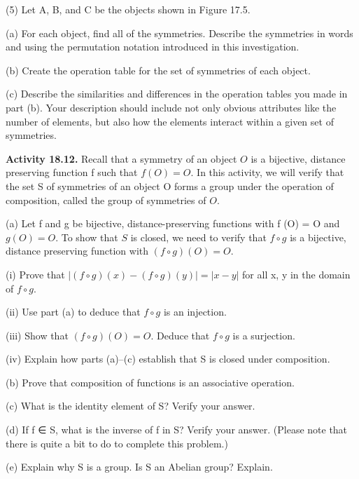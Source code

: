 \documentclass[11pt,a4paper]{article}
\begin{document}
(5) Let A, B, and C be the objects shown in Figure 17.5.

(a) For each object, find all of the symmetries. Describe the symmetries in words and using the permutation notation introduced in this investigation.

(b) Create the operation table for the set of symmetries of each object.

(c) Describe the similarities and differences in the operation tables you made in part (b). Your description should include not only obvious attributes like the number of elements, but also how the elements interact within a given set of symmetries.


{\bf Activity 18.12.} Recall that a symmetry of an object $O$ is a bijective, distance preserving function f such that $f (O) = O$. In this activity, we will verify that the set S of symmetries of an object O forms a group under the operation of composition, called the group of symmetries of $O$.

(a) Let f and g be bijective, distance-preserving functions with f (O) = O
and $g(O) = O$. To show that $S$ is closed, we need to verify that $f \circ g$ is a
bijective, distance preserving function with $(f \circ g)(O) = O$.

(i) Prove that $|(f \circ g)(x) − (f \circ g)(y)| = |x − y|$ for all x, y in the
domain of $f \circ g$.

(ii) Use part (a) to deduce that $f \circ g$ is an injection.

(iii) Show that $(f \circ g)(O) = O$. Deduce that $f \circ g$ is a surjection.

(iv) Explain how parts (a)–(c) establish that S is closed under composition.

(b) Prove that composition of functions is an associative operation.

(c) What is the identity element of S? Verify your answer.

(d) If f ∈ S, what is the inverse of f in S? Verify your answer. (Please note
that there is quite a bit to do to complete this problem.)

(e) Explain why S is a group. Is S an Abelian group? Explain.
\end{document}
